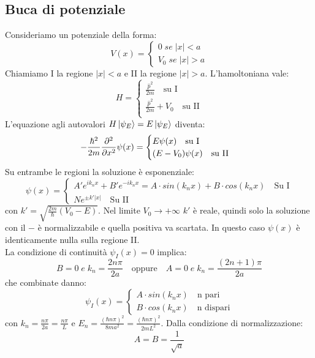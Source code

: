 \documentclass{article}
\begin{document}
\subsection{Buca di potenziale}
Consideriamo un potenziale della forma:
$$V(x)=\begin{cases}
    0\;se\;|x|<a\\
    V_0\;se\;|x|>a
\end{cases}$$
Chiamiamo I la regione $|x|<a$ e II la regione $|x|>a$. L'hamoltoniana vale:
$$ H=\begin{cases}
    \frac{\hat{p}^2}{2m}\quad\text{su I}\\
    \frac{\hat{p}^2}{2m}+V_0\quad\text{su II}\\
\end{cases} $$
L'equazione agli autovalori $H\ket{\psi_E}=E\ket{\psi_E}$ diventa:
$$ -\frac{\hbar^2}{2m}\pdv{^2}{x^2}\psi(x)=\begin{cases}
    E\psi(x)\quad\text{su I}\\
    (E-V_0)\psi(x)\quad\text{su II}\\
\end{cases} $$
Su entrambe le regioni la soluzione è esponenziale:
$$ \psi(x)=\begin{cases}
    A'e^{ik_nx}+B'e^{-ik_nx}=A\cdot sin(k_nx)+B\cdot cos(k_nx)\quad\text{Su I}\\
    Ne^{\pm k'|x|}\quad\text{Su II}
\end{cases} $$
con $k'=\sqrt{\frac{2m}{\hbar}(V_0-E)}$. Nel limite $V_0\rightarrow+\infty$ $k'$ è reale, quindi solo la soluzione con il $-$ è normalizzabile e quella positiva va scartata. In questo caso $\psi(x)$ è identicamente nulla sulla regione II.\\
La condizione di continuità $\psi_I(x)=0$ implica:
$$ B=0\;e\; k_n=\frac{2n\pi}{2a} \quad\text{oppure}\quad A=0\;e\; k_n=\frac{(2n+1)\pi}{2a}$$
che combinate danno:
$$ \psi_I(x)=\begin{cases}
    A\cdot sin(k_nx)\quad\text{n pari}\\
    B\cdot cos(k_nx)\quad\text{n dispari}
\end{cases} $$
con $k_n=\frac{n\pi}{2a}=\frac{n\pi}{L}$ e $E_n=\frac{(\hbar n\pi)^2}{8ma^2}=\frac{(\hbar n\pi)^2}{2mL^2}$. Dalla condizione di normalizzazione:
$$ A=B=\frac{1}{\sqrt{a}} $$
\end{document}
